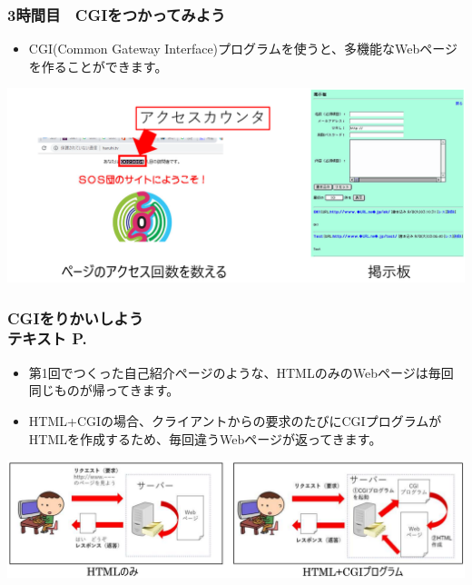 

\begin{frame}[fragile]
	\frametitle{3時間目　CGIをつかってみよう ~~~}
        \begin{itemize}\small
            \item CGI(Common Gateway Interface)プログラムを使うと、多機能なWebページを作ることができます。
        \end{itemize}
        \begin{minipage}{\textwidth}
            {\upshape
              \includegraphics[width=\textwidth]{./slide07-img/slide07-img008.png}}
        \end{minipage}
\end{frame}

\begin{frame}[fragile]
	\frametitle{CGIをりかいしよう\\テキスト P.\pageref{1:P:slide_p28}~~~}
        \begin{itemize}\small
            \item 第1回でつくった自己紹介ページのような、HTMLのみのWebページは毎回同じものが帰ってきます。
            \item HTML+CGIの場合、クライアントからの要求のたびにCGIプログラムがHTMLを作成するため、毎回違うWebページが返ってきます。
        \end{itemize}
        \begin{minipage}{\textwidth}
            {\upshape
              \includegraphics[width=\textwidth]{./slide07-img/slide07-img010.png}}
        \end{minipage}
\end{frame}

